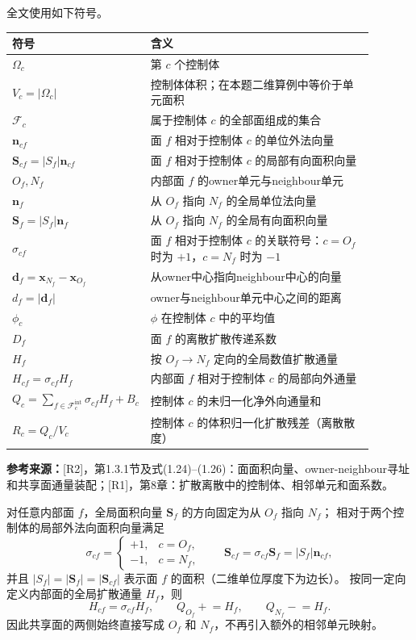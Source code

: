 \documentclass[UTF8,12pt,a4paper]{ctexart}
\numberwithin{equation}{section}
\newcommand{\Rone}{\textnormal{[R1]}}
\newcommand{\Rtwo}{\textnormal{[R2]}}
\newcommand{\source}[1]{%
  \par\smallskip
  \noindent\colorbox{sourcebg}{%
    \parbox{0.955\linewidth}{\raggedright\footnotesize\color{sourcegray}\textbf{参考来源：}#1}%
  }
  \par\smallskip
}
\newcommand{\Sf}{\bm S}
\newcommand{\xf}{\bm x}
\begin{document}
全文使用如下符号。
\begin{longtable}{>{\centering\arraybackslash}p{0.20\linewidth}p{0.69\linewidth}}
\toprule
符号 & 含义\\
\midrule
$\Omega_c$ & 第 $c$ 个控制体\\
$V_c=|\Omega_c|$ & 控制体体积；在本题二维算例中等价于单元面积\\
$\mathcal F_c$ & 属于控制体 $c$ 的全部面组成的集合\\
$\bm n_{cf}$ & 面 $f$ 相对于控制体 $c$ 的单位外法向量\\
$\Sf_{cf}=|S_f|\bm n_{cf}$ & 面 $f$ 相对于控制体 $c$ 的局部有向面积向量\\
$O_f,N_f$ & 内部面 $f$ 的owner单元与neighbour单元\\
$\bm n_f$ & 从 $O_f$ 指向 $N_f$ 的全局单位法向量\\
$\Sf_f=|S_f|\bm n_f$ & 从 $O_f$ 指向 $N_f$ 的全局有向面积向量\\
$\sigma_{cf}$ & 面 $f$ 相对于控制体 $c$ 的关联符号：$c=O_f$ 时为 $+1$，$c=N_f$ 时为 $-1$\\
$\bm d_f=\xf_{N_f}-\xf_{O_f}$ & 从owner中心指向neighbour中心的向量\\
$d_f=|\bm d_f|$ & owner与neighbour单元中心之间的距离\\
$\phi_c$ & $\phi$ 在控制体 $c$ 中的平均值\\
$D_f$ & 面 $f$ 的离散扩散传递系数\\
$H_f$ & 按 $O_f\to N_f$ 定向的全局数值扩散通量\\
$H_{cf}=\sigma_{cf}H_f$ & 内部面 $f$ 相对于控制体 $c$ 的局部向外通量\\
$Q_c=\sum_{f\in\mathcal F_c^{\mathrm{int}}}\sigma_{cf}H_f+B_c$ & 控制体 $c$ 的未归一化净外向通量和\\
$R_c=Q_c/V_c$ & 控制体 $c$ 的体积归一化扩散残差（离散散度）\\
\bottomrule
\end{longtable}

\source{\Rtwo，第1.3.1节及式(1.24)--(1.26)：面面积向量、owner-neighbour寻址和共享面通量装配；\Rone，第8章：扩散离散中的控制体、相邻单元和面系数。}

对任意内部面 $f$，全局面积向量 $\Sf_f$ 的方向固定为从 $O_f$ 指向 $N_f$；
相对于两个控制体的局部外法向面积向量满足
\begin{equation}
  \boxed{
  \sigma_{cf}=
  \begin{cases}
    +1,&c=O_f,\\
    -1,&c=N_f,
  \end{cases}
  \qquad
  \Sf_{cf}=\sigma_{cf}\Sf_f=|S_f|\bm n_{cf}},
  \label{eq:local_global_area_vectors}
\end{equation}
并且 $|S_f|=|\Sf_f|=|\Sf_{cf}|$ 表示面 $f$ 的面积（二维单位厚度下为边长）。
按同一定向定义内部面的全局扩散通量 $H_f$，则
\begin{equation}
  \boxed{
  H_{cf}=\sigma_{cf}H_f,
  \qquad
  Q_{O_f}\mathrel{+}=H_f,
  \qquad
  Q_{N_f}\mathrel{-}=H_f.}
  \label{eq:global_face_assembly}
\end{equation}
因此共享面的两侧始终直接写成 $O_f$ 和 $N_f$，不再引入额外的相邻单元映射。
\end{document}
